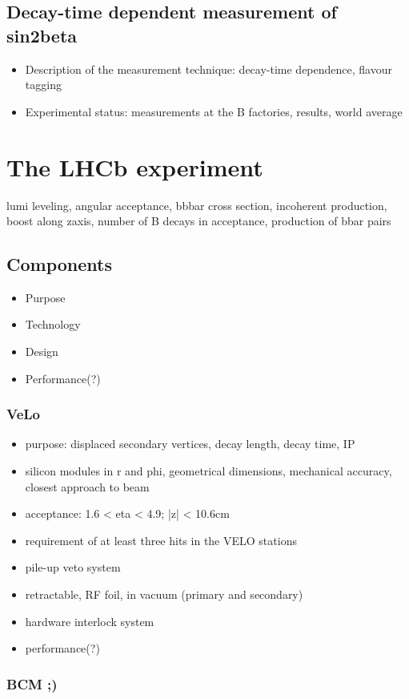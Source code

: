 \section{Decay-time dependent measurement of sin2beta}
\begin{itemize}
  \item Description of the measurement technique: decay-time dependence, flavour tagging
  \item Experimental status: measurements at the B factories, results, world average
\end{itemize}

\chapter{The LHCb experiment}
lumi leveling, angular acceptance, bbbar cross section, incoherent production, boost along zaxis, number of B decays in acceptance, production of bbar pairs
\section{Components}
\begin{itemize}
  \item Purpose
  \item Technology
  \item Design
  \item Performance(?)
\end{itemize}
\subsection{VeLo}
\begin{itemize}
  \item purpose: displaced secondary vertices, decay length, decay time, IP
  \item silicon modules in r and phi, geometrical dimensions, mechanical accuracy, closest approach to beam
  \item acceptance: 1.6 < eta < 4.9; |z| < 10.6cm
  \item requirement of at least three hits in the VELO stations
  \item pile-up veto system
  \item retractable, RF foil, in vacuum (primary and secondary)
  \item hardware interlock system
  \item performance(?)
\end{itemize}
\subsection{BCM ;)}
